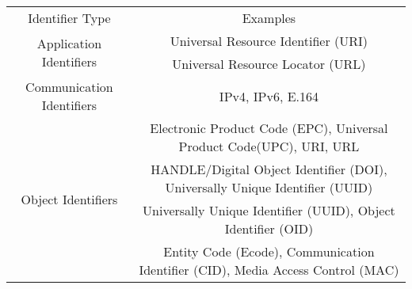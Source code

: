 \documentclass{standalone}
\begin{document}
\begin{tabular}{ | c | c |}
       \hline
        
       \multirow{2}{*}{Identifier Type}  &  \multirow{2}{*}{Examples}  \\
                                         &             \\
       \hline
       \multirow{2}{*}{Application Identifiers}  &  Universal Resource Identifier (URI) \\
                                                 &  Universal Resource Locator (URL)    \\
       \hline
       \multirow{2}{*}{Communication Identifiers} & \multirow{2}{*}{IPv4, IPv6, E.164}  \\
                                                  &                                     \\    
       \hline
       \multirow{4}{*}{Object Identifiers} &  Electronic Product Code (EPC),  Universal Product Code(UPC), URI, URL           \\  
                                           &  HANDLE/Digital Object Identifier (DOI), Universally Unique Identifier (UUID)    \\
                                           &  Universally Unique Identifier (UUID),  Object Identifier (OID)                  \\
                                           &  Entity Code (Ecode), Communication Identifier (CID), Media Access Control (MAC) \\
       \hline   
\end{tabular}
 
\end{document}
